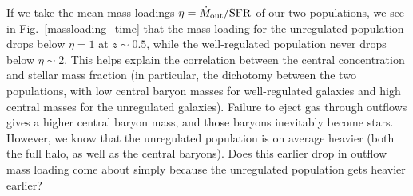 If we take the mean mass loadings $\eta = \dot M_{\rm out}/\rm{SFR}$ of our two
populations, we see in Fig.~\ref{massloading_time} that the mass loading for
the unregulated population drops below $\eta=1$ at $z\sim0.5$, while the
well-regulated population never drops below $\eta\sim2$.  This helps explain the
correlation between the central concentration and stellar mass fraction (in
particular, the dichotomy between the two populations, with low central baryon
masses for well-regulated galaxies and high central masses for the unregulated
galaxies).  Failure to eject gas through outflows gives a higher central baryon
mass, and those baryons inevitably become stars.  However, we know that the
unregulated population is on average heavier (both the full halo, as well as the
central baryons).  Does this earlier drop in outflow mass loading come about
simply because the unregulated population gets heavier earlier?

